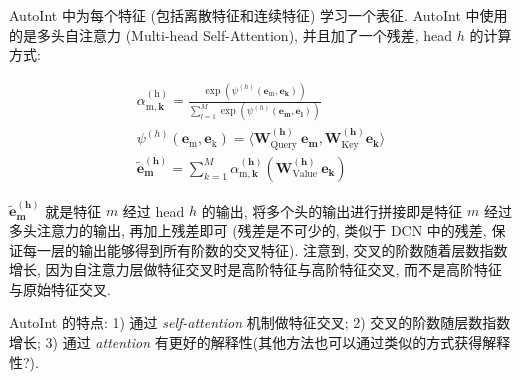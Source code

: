 AutoInt 中为每个特征 (包括离散特征和连续特征) 学习一个表征. AutoInt 中使用的是多头自注意力 (Multi-head Self-Attention), 并且加了一个残差, head $h$ 的计算方式:

$$
\begin{gathered}
	\alpha_{\mathrm{m}, \mathbf{k}}^{(\mathrm{h})}=\frac{\exp (\psi^{(h)}\left(\mathbf{e}_{\mathrm{m}}, \mathbf{e}_{\mathbf{k}}\right))}{\sum_{l=1}^M \exp (\psi^{(h)}\left(\mathbf{e}_{\mathbf{m}}, \mathbf{e}_{\mathbf{l}}\right))} \\
	\psi^{(h)}(\mathbf{e}_{\mathrm{m}}, \mathbf{e}_{\mathrm{k}})=\langle\mathbf{W}_{\text {Query }}^{(\mathbf{h})} \mathbf{e}_{\mathbf{m}}, \mathbf{W}_{\text {Key }}^{(\mathbf{h})} \mathbf{e}_{\mathbf{k}}\rangle \\
	\widetilde{\mathbf{e}}_{\mathbf{m}}^{(\mathbf{h})}=\sum_{k=1}^M \alpha_{\mathrm{m}, \mathbf{k}}^{(\mathbf{h})}(\mathbf{W}_{\text {Value }}^{(\mathbf{h})} \mathbf{e}_{\mathbf{k}})
\end{gathered}
$$

$\widetilde{\mathbf{e}}_{\mathbf{m}}^{(\mathbf{h})}$ 就是特征 $m$ 经过 head $h$ 的输出, 将多个头的输出进行拼接即是特征 $m$ 经过多头注意力的输出, 再加上残差即可 (残差是不可少的, 类似于 DCN 中的残差, 保证每一层的输出能够得到所有阶数的交叉特征). 注意到, 交叉的阶数随着层数指数增长, 因为自注意力层做特征交叉时是高阶特征与高阶特征交叉, 而不是高阶特征与原始特征交叉. 

AutoInt 的特点: 1) 通过 \textit{self-attention} 机制做特征交叉; 2) 交叉的阶数随层数指数增长; 3) 通过 \textit{attention} 有更好的解释性(其他方法也可以通过类似的方式获得解释性?).
